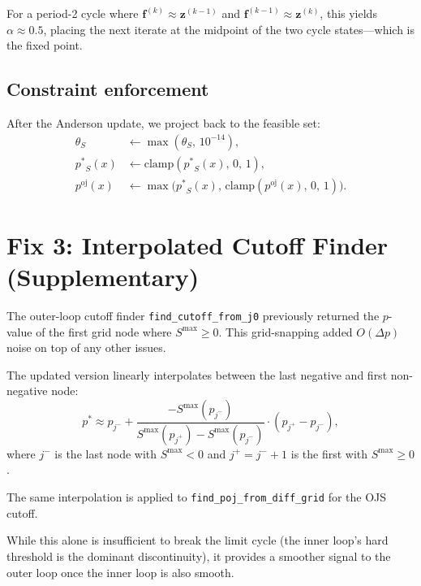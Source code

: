 \documentclass[11pt,a4paper]{article}
\newcommand{\pstar}{\mathord{p^{*}}}
\newcommand{\poj}{\mathord{p^{\mathrm{oj}}}}
\newcommand{\code}[1]{\texttt{#1}}
\theoremstyle{definition}
\begin{document}
For a period-2 cycle where $\mathbf{f}^{(k)} \approx \mathbf{z}^{(k-1)}$
and $\mathbf{f}^{(k-1)} \approx \mathbf{z}^{(k)}$, this yields
$\alpha \approx 0.5$, placing the next iterate at the midpoint of the two
cycle states---which is the fixed point.

\subsection{Constraint enforcement}

After the Anderson update, we project back to the feasible set:
\begin{align}
    \theta_S       &\leftarrow \max(\theta_S,\, 10^{-14}), \\
    \pstar_S(x)    &\leftarrow \mathrm{clamp}(\pstar_S(x),\, 0,\, 1), \\
    \poj(x)        &\leftarrow \max\bigl(\pstar_S(x),\,
                                \mathrm{clamp}(\poj(x),\, 0,\, 1)\bigr).
\end{align}

\section{Fix 3: Interpolated Cutoff Finder (Supplementary)}
\label{sec:interpolation}

The outer-loop cutoff finder \code{find\_cutoff\_from\_j0} previously
returned the $p$-value of the first grid node where $S^{\max} \geq 0$.
This grid-snapping added $O(\Delta p)$ noise on top of any other issues.

The updated version linearly interpolates between the last negative and
first non-negative node:
\begin{equation}
    \pstar \approx p_{j^{-}} +
    \frac{-S^{\max}(p_{j^{-}})}{S^{\max}(p_{j^{+}}) - S^{\max}(p_{j^{-}})}
    \cdot (p_{j^{+}} - p_{j^{-}}),
\end{equation}
where $j^{-}$ is the last node with $S^{\max} < 0$ and
$j^{+} = j^{-} + 1$ is the first with $S^{\max} \geq 0$.

The same interpolation is applied to
\code{find\_poj\_from\_diff\_grid} for the OJS cutoff.

While this alone is insufficient to break the limit cycle (the inner loop's
hard threshold is the dominant discontinuity), it provides a smoother signal
to the outer loop once the inner loop is also smooth.
\end{document}
